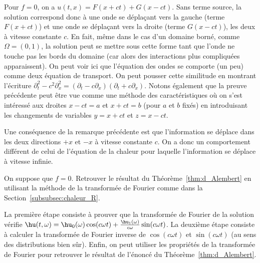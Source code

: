 \documentclass[12pt,a4paper,twoside]{article}
\begin{document}
\begin{remark}
  Pour $f=0$, on a $u(t,x) = F(x+ct) + G(x-ct)$.
  Sans terme source, la solution correspond donc \`a une onde se d\'epla\c{c}ant vers la gauche
  (terme $F(x+ct)$) et une onde se d\'epla\c{c}ant vers la droite (terme $G(x-ct)$), les deux
  \`a vitesse constante $c$.
  En fait, m\^eme dans le cas d'un domaine born\'e, comme $\Omega = (0,1)$,
  la solution peut se mettre sous cette forme tant que l'onde ne touche pas les bords du domaine
  (car alors des interactions plus compliqu\'ees apparaissent).
  On peut voir ici que l'\'equation des ondes se comporte (un peu)
  comme deux \'equation de transport.
  On peut pousser cette similitude en montrant l'\'ecriture
  $\partial_t^2 - c^2 \partial_x^2 = (\partial_t - c \partial_x)(\partial_t + c \partial_x)$.
  Notons \'egalement que la preuve pr\'ec\'edente peut \^etre vue
  comme une m\'ethode des caract\'eristiques o\`u on s'est int\'eress\'e aux droites
  $x-ct = a$ et $x+ct = b$ (pour $a$ et $b$ fix\'es) en introduisant les changements de variables
  $y = x+ct$ et $z = x-ct$.
\end{remark}

\begin{remark}
  Une cons\'equence de la remarque pr\'ec\'edente est que l'information se d\'eplace dans les
  deux directions $+x$ et $-x$ \`a vitesse constante $c$.
  On a donc un comportement diff\'erent de celui de l'\'equation de la chaleur pour laquelle
  l'information se d\'eplace \`a vitesse infinie.
\end{remark}

\begin{exercise}
  On suppose que $f = 0$.
  Retrouver le r\'esultat du Th\'eor\`eme~\ref{thm:d_Alembert}
  en utilisant la m\'ethode de la transform\'ee de Fourier comme dans
  la Section~\ref{subsubsec:chaleur_R}.

  La premi\`ere \'etape consiste \`a prouver que la transform\'ee de Fourier
  de la solution v\'erifie
  $\hu(t,\omega) = \hu_0(\omega) \cos(c \omega t) + \frac{\hu_1(\omega)}{c \omega} \sin(c \omega t)$.
  La deuxi\`eme \'etape consiste \`a calculer la transform\'ee de Fourier inverse de
  $\cos(c \omega t)$ et $\sin(c \omega t)$ (au sens des distributions bien s\^ur).
  Enfin, on peut utiliser les propri\'et\'es de la transform\'ee de Fourier pour retrouver
  le r\'esultat de l'\'enonc\'e du Th\'eor\`eme~\ref{thm:d_Alembert}.
\end{exercise}
\end{document}
